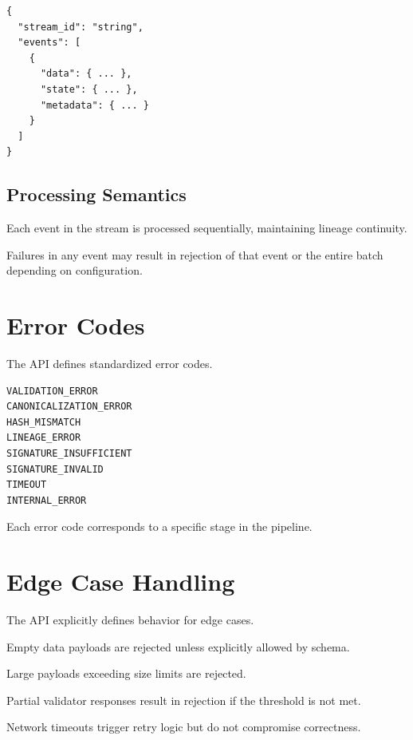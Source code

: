 \begin{verbatim}
{
  "stream_id": "string",
  "events": [
    {
      "data": { ... },
      "state": { ... },
      "metadata": { ... }
    }
  ]
}
\end{verbatim}

\subsection{Processing Semantics}

Each event in the stream is processed sequentially, maintaining lineage continuity.

Failures in any event may result in rejection of that event or the entire batch depending on configuration.

\section{Error Codes}

The API defines standardized error codes.

\begin{verbatim}
VALIDATION_ERROR
CANONICALIZATION_ERROR
HASH_MISMATCH
LINEAGE_ERROR
SIGNATURE_INSUFFICIENT
SIGNATURE_INVALID
TIMEOUT
INTERNAL_ERROR
\end{verbatim}

Each error code corresponds to a specific stage in the pipeline.

\section{Edge Case Handling}

The API explicitly defines behavior for edge cases.

Empty data payloads are rejected unless explicitly allowed by schema.

Large payloads exceeding size limits are rejected.

Partial validator responses result in rejection if the threshold is not met.

Network timeouts trigger retry logic but do not compromise correctness.

